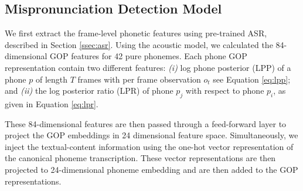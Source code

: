 \documentclass{INTERSPEECH2023}
\begin{document}
\begin{table*}[!ht]
\centering
{}

\caption{Phoneme-level statistics for Speechocean762 corpus, and phoneme, grapheme-level statistics for AraVoiceL2 corpus, along with the score definition used in the study. Label \textit{0}: mispronounced or missing phoneme, Label \textit{1}: accented pronunciation and Label \textit{2}: is for good pronunciation.}
\label{tab:output_defination}
\vspace{-0.7cm}
\end{table*}



\subsection{Mispronunciation Detection Model}



We first extract the frame-level phonetic features using pre-trained ASR, described in Section \ref{ssec:asr}. Using the acoustic model, we calculated the 84-dimensional GOP features for 42 pure phonemes. 
Each phone GOP representation contain two different features: \textit{(i)} log phone posterior (LPP) \cite{transfer_} of a phone $p$ of length $T$ frames with per frame observation $o_t$ see Equation \ref{eq:lpp}; 
and \textit{(ii)} the log posterior ratio (LPR) \cite{transfer_} of phone $p_{j}$ with respect to phone $p_i$, as given in Equation \ref{eq:lpr}.

\noindent These 84-dimensional features are then passed through a feed-forward layer to project the GOP embeddings in 24 dimensional feature space.  
Simultaneously, we inject the textual-content information using the one-hot vector representation of the canonical phoneme transcription. These vector representations are then projected to 24-dimensional phoneme embedding and are then added to the GOP representations.
\end{document}

